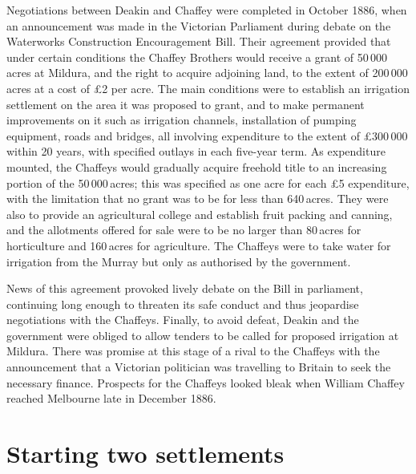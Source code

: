 Negotiations between Deakin and Chaffey were completed in October
1886, when an announcement was made in the Victorian Parliament during
debate on the Waterworks Construction Encouragement Bill.  Their
agreement provided that under certain conditions the Chaffey Brothers
would receive a grant of 50\,000\,acres at Mildura, and the right to
acquire adjoining land, to the extent of 200\,000\,acres at a cost of
\pounds2 per acre.  The main conditions were to establish an irrigation
settlement on the area it was proposed to grant, and to make permanent
improvements on it such as irrigation channels, installation of
pumping equipment, roads and bridges, all involving expenditure to the
extent of \pounds300\,000 within 20 years, with specified outlays in
each five-year term.  As expenditure mounted, the Chaffeys would
gradually acquire freehold title to an increasing portion of the
50\,000\,acres; this was specified as one acre for each \pounds5
expenditure, with the limitation that no grant was to be for less than
640\,acres.  They were also to provide an agricultural college and
establish fruit packing and canning, and the allotments offered for
sale were to be no larger than 80\,acres for horticulture and
160\,acres for agriculture. The Chaffeys were to take water for
irrigation from the Murray but only as authorised by the
government.

News of this agreement provoked lively debate on the Bill in
parliament, continuing long enough to threaten its safe conduct and
thus jeopardise negotiations with the Chaffeys.  Finally, to avoid
defeat, Dea\-kin and the government were obliged to allow tenders to
be called for proposed irrigation at Mildura.  There was promise at
this stage of a rival to the Chaffeys with the announcement that a
Victorian politician was travelling to Britain to seek the necessary
finance.  Prospects for the Chaffeys looked bleak when William Chaffey
reached Melbourne late in December 1886.

\section*{Starting two settlements}

